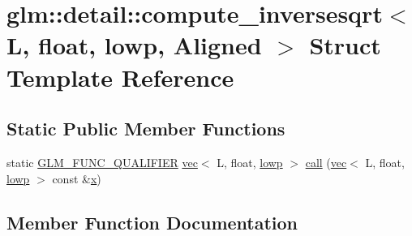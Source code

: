 \hypertarget{structglm_1_1detail_1_1compute__inversesqrt_3_01_l_00_01float_00_01lowp_00_01_aligned_01_4}{}\section{glm\+:\+:detail\+:\+:compute\+\_\+inversesqrt$<$ L, float, lowp, Aligned $>$ Struct Template Reference}
\label{structglm_1_1detail_1_1compute__inversesqrt_3_01_l_00_01float_00_01lowp_00_01_aligned_01_4}
\subsection*{Static Public Member Functions}
\begin{DoxyCompactItemize}
\item 
static \hyperlink{setup_8hpp_a33fdea6f91c5f834105f7415e2a64407}{G\+L\+M\+\_\+\+F\+U\+N\+C\+\_\+\+Q\+U\+A\+L\+I\+F\+I\+ER} \hyperlink{structglm_1_1vec}{vec}$<$ L, float, \hyperlink{namespaceglm_a36ed105b07c7746804d7fdc7cc90ff25ae161af3fc695e696ce3bf69f7332bc2d}{lowp} $>$ \hyperlink{structglm_1_1detail_1_1compute__inversesqrt_3_01_l_00_01float_00_01lowp_00_01_aligned_01_4_afac251e9e18084ffd62fe54d0c2c0a32}{call} (\hyperlink{structglm_1_1vec}{vec}$<$ L, float, \hyperlink{namespaceglm_a36ed105b07c7746804d7fdc7cc90ff25ae161af3fc695e696ce3bf69f7332bc2d}{lowp} $>$ const \&\hyperlink{_s_d_l__opengl_8h_ad0e63d0edcdbd3d79554076bf309fd47}{x})
\end{DoxyCompactItemize}


\subsection{Member Function Documentation}
\mbox{\label{structglm_1_1detail_1_1compute__inversesqrt_3_01_l_00_01float_00_01lowp_00_01_aligned_01_4_afac251e9e18084ffd62fe54d0c2c0a32}} 

